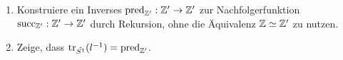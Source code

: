 \documentclass{uebung}
\begin{document}
\begin{exercise}
  \begin{enumerate}
    \item Konstruiere ein Inverses $\mathrm{pred}_{\mathbb{Z}'}:\mathbb{Z}'\to\mathbb{Z}'$ zur Nachfolgerfunktion $\mathrm{succ}_{\mathbb{Z}'}:\mathbb{Z}'\to\mathbb{Z}'$ durch Rekursion, ohne die Äquivalenz $\mathbb{Z}\simeq\mathbb{Z}'$ zu nutzen.
    \item Zeige, dass $\mathrm{tr}_{\tilde{S^1}}(l^{-1})=\mathrm{pred}_{\mathbb{Z}'}$.
  \end{enumerate}
\end{exercise}
\end{document}
